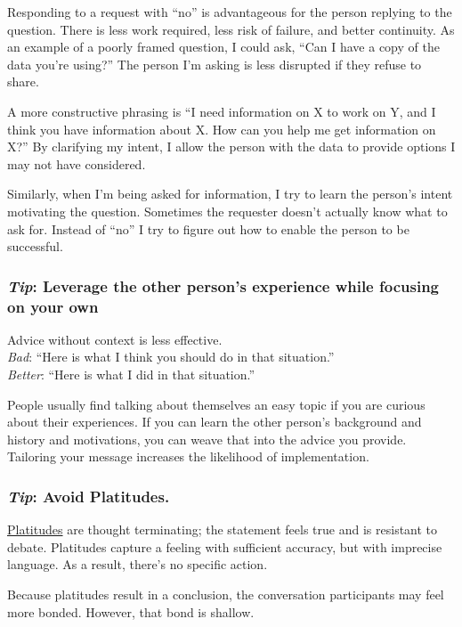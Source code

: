 Responding to a request with ``no'' is advantageous for the person replying to the question. There is less work required, less risk of failure, and better continuity. As an example of a poorly framed question, I could ask, ``Can I have a copy of the data you're using?'' The person I'm asking is less disrupted if they refuse to share. 

A more constructive phrasing is ``I need information on X to work on Y, and I think you have information about X. How can you help me get information on X?'' By clarifying my intent, I allow the person with the data to provide options I may not have considered.

Similarly, when I'm being asked for information, I try to learn the person's intent motivating the question. Sometimes the requester doesn't actually know what to ask for. Instead of ``no'' I try to figure out how to enable the person to be successful. 

\subsubsection*{\textit{Tip}: Leverage the other person's experience while focusing on your own\label{sec:advice}}

Advice without context is less effective.\\
\textit{Bad}: ``Here is what I think you should do in that situation.''\\
\textit{Better}: ``Here is what I did in that situation.''

People usually find talking about themselves an easy topic if you are curious about their experiences. 
If you can learn the other person's background and history and motivations, you can weave that into the advice you provide. 
Tailoring your message increases the likelihood of implementation. 

\subsubsection*{\textit{Tip}: Avoid Platitudes\label{sec:platitudes}.}
\href{https://en.wikipedia.org/wiki/Platitude}{Platitudes} are \gls{thought terminating}; the statement feels true and is resistant to debate. Platitudes capture a feeling with sufficient accuracy, but with imprecise language. As a result, there's no specific action.

Because platitudes result in a conclusion, the conversation participants may feel more bonded. However, that bond is shallow.

